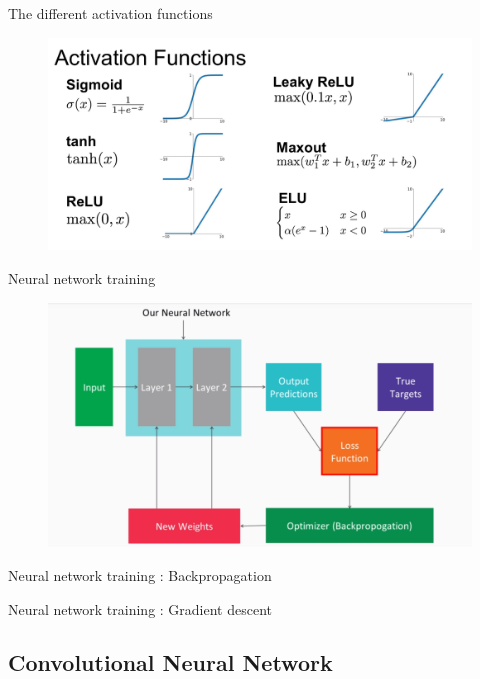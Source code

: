 \documentclass[tikz,table,border=2mm]{beamer}
\begin{document}
\begin{frame}{The different activation functions}
\begin{figure}[ht]
    \centering
    \includegraphics[width=\textwidth]{images/deeplearning_4.png}
\end{figure}
\end{frame}
\begin{frame}{Neural network training}
\begin{figure}[ht]
    \centering
    \includegraphics[width=\textwidth]{images/training_deeplearning.png}
\end{figure}
\end{frame}
\begin{frame}{Neural network training : Backpropagation}
\end{frame}
\begin{frame}{Neural network training : Gradient descent}
\end{frame}
\subsection{Convolutional Neural Network}
\end{document}
